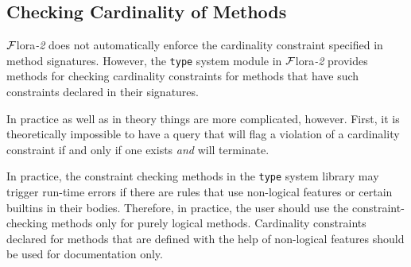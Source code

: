 \documentclass[11pt]{article}
\newcommand{\FLORA}{{\mbox{\sc ${\cal F}${lora}\rm\emph{-2}}}\xspace}
\begin{document}
\subsection{Checking Cardinality of Methods}\label{sec-cardinality}

\FLORA does not automatically enforce the cardinality constraint specified
in method signatures.  However, the {\tt type} system module in \FLORA
provides methods for checking cardinality
constraints for methods that have such constraints declared in their
signatures.

In practice as well as in theory things are more complicated, however.
First, it is theoretically impossible to have a query that will flag a
violation of a cardinality constraint if and only if one exists \emph{and}
will terminate.

In practice, the constraint checking methods
in the {\tt type} system library may trigger run-time
errors if there are rules that use non-logical features or certain builtins
in their bodies.  Therefore, in practice, the user should use the
constraint-checking methods only for purely logical methods. Cardinality
constraints declared for methods that are defined with the help of
non-logical features should be used for documentation only.
\end{document}
